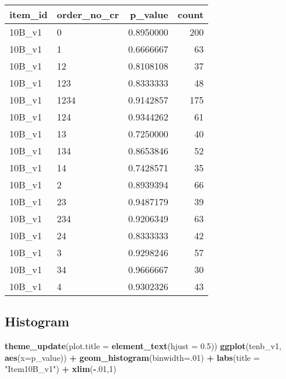 \documentclass[]{book}
\newenvironment{Shaded}{\begin{snugshade}}{\end{snugshade}}
\newcommand{\KeywordTok}[1]{\textcolor[rgb]{0.13,0.29,0.53}{\textbf{#1}}}
\newcommand{\DataTypeTok}[1]{\textcolor[rgb]{0.13,0.29,0.53}{#1}}
\newcommand{\DecValTok}[1]{\textcolor[rgb]{0.00,0.00,0.81}{#1}}
\newcommand{\FloatTok}[1]{\textcolor[rgb]{0.00,0.00,0.81}{#1}}
\newcommand{\StringTok}[1]{\textcolor[rgb]{0.31,0.60,0.02}{#1}}
\newcommand{\OperatorTok}[1]{\textcolor[rgb]{0.81,0.36,0.00}{\textbf{#1}}}
\newcommand{\NormalTok}[1]{#1}
\theoremstyle{definition}
\theoremstyle{definition}
\theoremstyle{definition}
\theoremstyle{remark}
\begin{document}
\begin{tabular}{l|l|r|r}
\hline
item\_id & order\_no\_cr & p\_value & count\\
\hline
10B\_v1 & 0 & 0.8950000 & 200\\
\hline
10B\_v1 & 1 & 0.6666667 & 63\\
\hline
10B\_v1 & 12 & 0.8108108 & 37\\
\hline
10B\_v1 & 123 & 0.8333333 & 48\\
\hline
10B\_v1 & 1234 & 0.9142857 & 175\\
\hline
10B\_v1 & 124 & 0.9344262 & 61\\
\hline
10B\_v1 & 13 & 0.7250000 & 40\\
\hline
10B\_v1 & 134 & 0.8653846 & 52\\
\hline
10B\_v1 & 14 & 0.7428571 & 35\\
\hline
10B\_v1 & 2 & 0.8939394 & 66\\
\hline
10B\_v1 & 23 & 0.9487179 & 39\\
\hline
10B\_v1 & 234 & 0.9206349 & 63\\
\hline
10B\_v1 & 24 & 0.8333333 & 42\\
\hline
10B\_v1 & 3 & 0.9298246 & 57\\
\hline
10B\_v1 & 34 & 0.9666667 & 30\\
\hline
10B\_v1 & 4 & 0.9302326 & 43\\
\hline
\end{tabular}

\subsection{Histogram}\label{histogram-2}

\begin{Shaded}
\begin{Highlighting}[]
\KeywordTok{theme_update}\NormalTok{(}\DataTypeTok{plot.title =} \KeywordTok{element_text}\NormalTok{(}\DataTypeTok{hjust =} \FloatTok{0.5}\NormalTok{))}
\KeywordTok{ggplot}\NormalTok{(tenb_v1, }\KeywordTok{aes}\NormalTok{(}\DataTypeTok{x=}\NormalTok{p_value)) }\OperatorTok{+}\StringTok{ }\KeywordTok{geom_histogram}\NormalTok{(}\DataTypeTok{binwidth=}\NormalTok{.}\DecValTok{01}\NormalTok{) }\OperatorTok{+}\StringTok{ }\KeywordTok{labs}\NormalTok{(}\DataTypeTok{title =} \StringTok{"Item10B_v1"}\NormalTok{) }\OperatorTok{+}\StringTok{ }\KeywordTok{xlim}\NormalTok{(}\OperatorTok{-}\NormalTok{.}\DecValTok{01}\NormalTok{,}\DecValTok{1}\NormalTok{)}
\end{Highlighting}
\end{Shaded}
\end{document}
